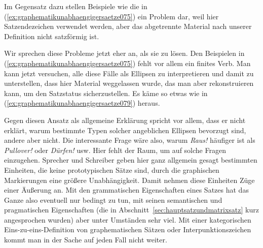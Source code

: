 Im Gegensatz dazu stellen Beispiele wie die in (\ref{ex:graphematikunabhaengigersaetze075}) ein Problem dar, weil hier Satzendezeichen verwendet werden, aber das abgetrennte Material nach unserer Definition nicht satzförmig ist.

\begin{exe}
  \ex\label{ex:graphematikunabhaengigersaetze075}
  \begin{xlist}
  \end{xlist}
\end{exe}

Wir sprechen diese Probleme jetzt eher an, als sie zu lösen.
Den Beispielen in (\ref{ex:graphematikunabhaengigersaetze075}) fehlt vor allem ein finites Verb.
Man kann jetzt versuchen, alle diese Fälle als Ellipsen zu interpretieren und damit zu unterstellen, dass hier Material weggelassen wurde, das man aber rekonstruieren kann, um den Satzstatus sicherzustellen.
Es käme so etwas wie in (\ref{ex:graphematikunabhaengigersaetze079}) heraus.

\begin{exe}
  \ex\label{ex:graphematikunabhaengigersaetze079}
  \begin{xlist}
  \end{xlist}
\end{exe}

Gegen diesen Ansatz als allgemeine Erklärung spricht vor allem, dass er nicht erklärt, warum bestimmte Typen solcher angeblichen Ellipsen bevorzugt sind, andere aber nicht.
Die interessante Frage wäre also, warum \textit{Raus!} häufiger ist als \textit{Pullover!} oder \textit{Dürfen!} usw.
Hier fehlt der Raum, um auf solche Fragen einzugehen.
Sprecher und Schreiber geben hier ganz allgemein gesagt bestimmten Einheiten, die keine prototypischen Sätze sind, durch die graphischen Markierungen eine größere Unabhängigkeit.
Damit nehmen diese Einheiten Züge einer Äußerung an.
Mit den grammatischen Eigenschaften eines Satzes hat das Ganze also eventuell nur bedingt zu tun, mit seinen semantischen und pragmatischen Eigenschaften (die in Abschnitt~\ref{sec:hauptsatzundmatrixsatz} kurz angesprochen wurden) aber unter Umständen sehr viel.
Mit einer kategorischen Eins-zu-eins-Definition von graphematischen Sätzen oder Interpunktionszeichen kommt man in der Sache auf jeden Fall nicht weiter.

